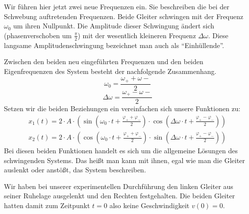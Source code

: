 \documentclass{article}
\begin{document}
                  Wir führen hier jetzt zwei neue Frequenzen ein. Sie beschreiben die bei der Schwebung auftretenden Frequenzen.
                  Beide Gleiter schwingen mit der Frequenz \(\omega_0\) um ihren Nullpunkt.
                  Die Amplitude dieser Schwingung ändert sich (phasenverschoben um \( \frac{\pi}{2} \)) mit der wesentlich kleineren Frequenz \( \Delta \omega \).
                  Diese langsame Amplitudenschwingung bezeichnet man auch als \enquote{Einhüllende}.

                  Zwischen den beiden neu eingeführten Frequenzen und den beiden Eigenfrequenzen des System besteht der nachfolgende Zusammenhang.
                  \begin{equation}\label{eq:omega_null}
                      \omega_0 = \frac{ \omega_{+} + \omega{-} }{ 2 }
                  \end{equation}
                  \begin{equation}\label{eq:delta_omega}
                      \Delta \omega = \frac{ \omega_{+} - \omega{-} }{ 2 }
                  \end{equation}
                  Setzen wir die beiden Beziehungen ein vereinfachen sich unsere Funktionen zu:
                  \begin{equation}
                      \begin{gathered}
                          x_1(t) = 2 \cdot A \cdot \left( \sin\left( \omega_0 \cdot t + \frac{\varphi_{+} + \varphi_{-} }{2} \right) \cdot \cos\left( \Delta \omega \cdot t + \frac{\varphi_{+} - \varphi_{-} }{2} \right) \right) \\
                          x_2(t) = 2 \cdot A \cdot \left( \cos\left( \omega_0 \cdot t + \frac{\varphi_{+} + \varphi_{-} }{2} \right) \cdot \sin\left( \Delta \omega \cdot t + \frac{\varphi_{+} - \varphi_{-} }{2} \right) \right)
                      \end{gathered}
                  \end{equation}
                  Bei diesen beiden Funktionen handelt es sich um die allgemeine Lösungen des schwingenden Systems.
                  Das heißt man kann mit ihnen, egal wie man die Gleiter auslenkt oder anstößt, das System beschreiben.

                  Wir haben bei unserer experimentellen Durchführung den linken Gleiter aus seiner Ruhelage ausgelenkt und den Rechten festgehalten.
                  Die beiden Gleiter hatten damit zum Zeitpunkt \(t = 0\) also keine Geschwindigkeit \( v(0) = 0\).
\end{document}
